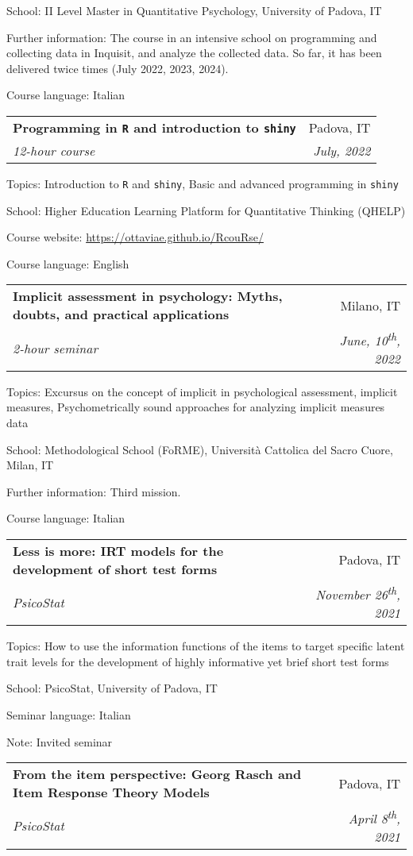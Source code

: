\documentclass[letterpaper,12pt]{article}
\makeatletter
\newcommand{\resumeSubheading}[4]{
  \vspace{-1pt}\item
    \begin{tabular*}{0.97\textwidth}{l@{\extracolsep{\fill}}r}
      \textbf{#1} & #2 \\
      \textit{\small#3} & \textit{\small #4} \\
    \end{tabular*}\vspace{-5pt}
}
\makeatother
\begin{document}
{\small School: II Level Master in Quantitative Psychology, University of Padova, IT} 

{\small Further information: The course in an intensive school on programming and collecting data in Inquisit, and analyze the collected data. So far, it has been delivered twice times (July 2022, 2023, 2024). } 

{\small Course language: Italian}


\resumeSubheading {Programming in \texttt{R} and introduction to \texttt{shiny}}{Padova, IT}{12-hour course}{July, 2022}

{\small Topics: Introduction to \texttt{R} and \texttt{shiny}, Basic and advanced programming in \texttt{shiny}} 

{\small School: Higher Education
	Learning Platform for Quantitative Thinking (QHELP)} 
	
{\small Course website: \href{https://ottaviae.github.io/RcouRse/}{https://ottaviae.github.io/RcouRse/}}

{\small Course language: English}

\resumeSubheading {Implicit assessment in psychology: Myths, doubts, and practical applications}{Milano, IT}{2-hour seminar}{June, 10\textsuperscript{th}, 2022}

{\small Topics: Excursus on the concept of implicit in psychological assessment, implicit measures, Psychometrically sound approaches for analyzing implicit measures data} 

{\small School: Methodological School (FoRME), Università Cattolica del Sacro Cuore, Milan, IT} 

{\small Further information: Third mission.  } 

{\small Course language: Italian}

\resumeSubheading {Less is more: IRT models for the development of short test forms}{Padova, IT}{PsicoStat}{November 26\textsuperscript{th}, 2021}


{\small Topics: How to use the information functions of the items to target specific latent trait levels for the development of highly informative yet brief short test forms} 

{\small School: PsicoStat, University of Padova, IT} 

{\small Seminar language: Italian}

{\small Note: Invited seminar}

\resumeSubheading {From the item perspective: Georg Rasch and Item Response Theory Models}{Padova, IT}{PsicoStat}{April 8\textsuperscript{th}, 2021}
\end{document}
